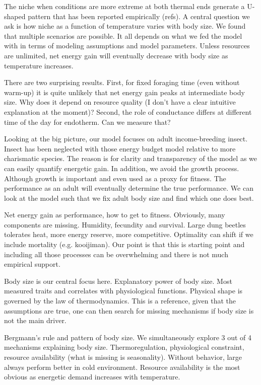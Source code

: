 The niche when conditions are more extreme at both thermal ends generate a U-shaped pattern that has been reported empirically (refs).
A central question we ask is how  niche as a function of temperature varies with body size.
We found that multiple scenarios are possible.
It all depends on what we fed the model with in terms of modeling assumptions and model parameters.
Unless resources are unlimited, net energy gain will eventually decrease with body size as temperature increases.

There are two surprising results.
First, for fixed foraging time (even without warm-up) it is quite unlikely that net energy gain peaks at intermediate body size.
Why does it depend on resource quality (I don't have a clear intuitive explanation at the moment)?
Second, the role of conductance differs at different time of the day for endotherm.
Can we measure that?  

Looking at the big picture, our model focuses on adult income-breeding insect.
Insect has been neglected with those energy budget model relative to more charismatic species.
The reason is for clarity and transparency of the model as we can easily quantify energetic gain.
In addition, we avoid the growth process.
Although growth is important and even used as a proxy for fitness.
The performance as an adult will eventually determine the true performance.
We can look at the model such that we fix adult body size and find which one does best. 

Net energy gain as performance, how to get to fitness.
Obviously, many components are missing.
Humidity, fecundity and survival.
Large dung beetles tolerates heat, more energy reserve, more competitive.
Optimality can shift if we include mortality (e.g. kooijiman).
Our point is that this is starting point and including all those processes can be overwhelming and there is not much empirical support.

Body size is our central focus here.
Explanatory power of body size.
Most measured traits and correlates with physiological functions.
Physical shape is governed by the law of thermodynamics.
This is a reference, given that the assumptions are true, one can then search for missing mechanisms if body size is not the main driver.

Bergmann's rule and pattern of body size.
We simultaneously explore 3 out of 4 mechanisms explaining body size.
Thermoregulation, physiological constraint, resource availability (what is missing is seasonality).
Without behavior, large always perform better in cold environment.
Resource availability is the most obvious as energetic demand increases with temperature.

